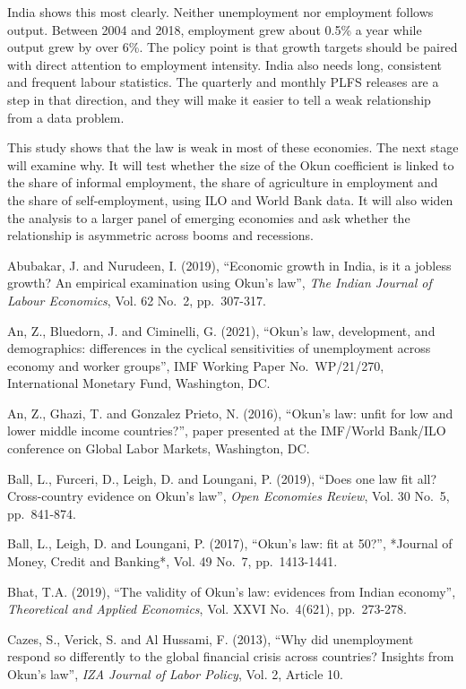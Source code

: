 \documentclass[12pt]{article}
\newcommand{\hone}[2]{\par\Needspace{4\baselineskip}\vspace{2pt}{\noindent\raggedright\bfseries
  \ifx\relax#1\relax\else\makebox[0.5in][l]{#1}\fi #2\par}\nopagebreak\vspace{-2pt}}
\begin{document}
India shows this most clearly. Neither unemployment nor employment follows output. Between 2004 and 2018, employment grew about 0.5\% a year while output grew by over 6\%. The policy point is that growth targets should be paired with direct attention to employment intensity. India also needs long, consistent and frequent labour statistics. The quarterly and monthly PLFS releases are a step in that direction, and they will make it easier to tell a weak relationship from a data problem.


This study shows that the law is weak in most of these economies. The next stage will examine why. It will test whether the size of the Okun coefficient is linked to the share of informal employment, the share of agriculture in employment and the share of self-employment, using ILO and World Bank data. It will also widen the analysis to a larger panel of emerging economies and ask whether the relationship is asymmetric across booms and recessions.


\hone{}{References}

Abubakar, J. and Nurudeen, I. (2019), “Economic growth in India, is it a jobless growth? An empirical examination using Okun’s law”, \textit{The Indian Journal of Labour Economics}, Vol. 62 No.~2, pp.~307-317.


An, Z., Bluedorn, J. and Ciminelli, G. (2021), “Okun’s law, development, and demographics: differences in the cyclical sensitivities of unemployment across economy and worker groups”, IMF Working Paper No.~WP/21/270, International Monetary Fund, Washington, DC.


An, Z., Ghazi, T. and Gonzalez Prieto, N. (2016), “Okun’s law: unfit for low and lower middle income countries?”, paper presented at the IMF/World Bank/ILO conference on Global Labor Markets, Washington, DC.


Ball, L., Furceri, D., Leigh, D. and Loungani, P. (2019), “Does one law fit all? Cross-country evidence on Okun’s law”, \textit{Open Economies Review}, Vol. 30 No.~5, pp.~841-874.


Ball, L., Leigh, D. and Loungani, P. (2017), “Okun’s law: fit at 50?”, *Journal of Money, Credit and Banking*, Vol. 49 No.~7, pp.~1413-1441.


Bhat, T.A. (2019), “The validity of Okun’s law: evidences from Indian economy”, \textit{Theoretical and Applied Economics}, Vol. XXVI No.~4(621), pp.~273-278.


Cazes, S., Verick, S. and Al Hussami, F. (2013), “Why did unemployment respond so differently to the global financial crisis across countries? Insights from Okun’s law”, \textit{IZA Journal of Labor Policy}, Vol. 2, Article 10.
\end{document}
